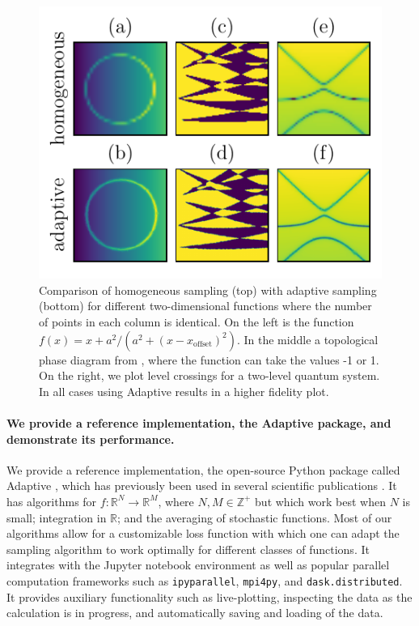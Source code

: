 \begin{figure}
\hypertarget{fig:Learner2D}{%
\centering
\includegraphics{chapter_adaptive/figures/Learner2D.pdf}
\caption{Comparison of homogeneous sampling (top) with adaptive sampling (bottom) for different two-dimensional functions where the number of points in each column is identical.
On the left is the function $f(x) = x + a ^ 2 / (a ^ 2 + (x - x_\textrm{offset}) ^ 2)$.
In the middle a topological phase diagram from \cite{Nijholt2016}, where the function can take the values -1 or 1.
On the right, we plot level crossings for a two-level quantum system.
In all cases using Adaptive results in a higher fidelity plot.}\label{fig:Learner2D}
}
\end{figure}

\hypertarget{we-provide-a-reference-implementation-the-adaptive-package-and-demonstrate-its-performance.}{%
\paragraph{We provide a reference implementation, the Adaptive package, and demonstrate its performance.}\label{we-provide-a-reference-implementation-the-adaptive-package-and-demonstrate-its-performance.}}

We provide a reference implementation, the open-source Python package called Adaptive \cite{Nijholt2019}, which has previously been used in several scientific publications \cite{Vuik2018, Laeven2019, Bommer2019, Melo2019}.
It has algorithms for $f \colon \mathbb{R}^N \to \mathbb{R}^M$, where $N, M \in \mathbb{Z}^+$ but which work best when $N$ is small; integration in $\mathbb{R}$; and the averaging of stochastic functions.
Most of our algorithms allow for a customizable loss function with which one can adapt the sampling algorithm to work optimally for different classes of functions.
It integrates with the Jupyter notebook environment as well as popular parallel computation frameworks such as \passthrough{\lstinline!ipyparallel!}, \passthrough{\lstinline!mpi4py!}, and \passthrough{\lstinline!dask.distributed!}.
It provides auxiliary functionality such as live-plotting, inspecting the data as the calculation is in progress, and automatically saving and loading of the data.

